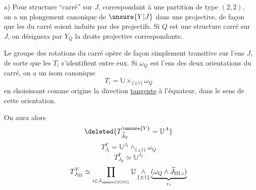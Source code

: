 a) Pour  structure ``carré'' sur $J$, correspondant à une partition de type $(2,2)$, on a un plongement canonique de $\unsure{Y|J}$ dans une  projective, de façon que les    du carré soient induits par des  projectifs. Si $Q$ est une structure carré sur $J$, on désignera par $Y_Q$ la droite projective correspondante. 


Le groupe des rotations du carré opère de façon simplement transitive sur l'ens $J$, de sorte que les $T_i$ s'identifient entre eux. Si $\omega_Q$ est l'ens des deux orientations du carré,  on a un isom canonique
\[
T_i=\mathbb{U}\times_{\{\pm1\}}\omega_Q
\]
en choisissant comme origine  la direction \uline{tangente}
à l'équateur, dans le sens de cette orientation.

On aura alors
\[
\deleted{T_{\widehat A_2}^{\unsure{Y}}=\mathbb U^A}
\]
\[
T_{J_{\mathrm I}}^Y=\mathbb U^{J_{\mathrm I}}\mathop{\wedge}_{\{\pm1\}}\omega_Q
\]
\[
T_{J_{\mathrm {II}}}^Y\simeq\mathbb U^{J_2}
\]
\[
T_{J_{\mathrm{III}}}^Y\simeq
\prod_{i\in J_{\unsure{\mathrm{II}|\mathrm{III}}}}
\mathbb U\mathop{\wedge}_{\{\pm1\}}
\underbrace{(\omega_Q\wedge\widetilde J_{\mathrm{III},i})}_{\varepsilon_i}
\]

